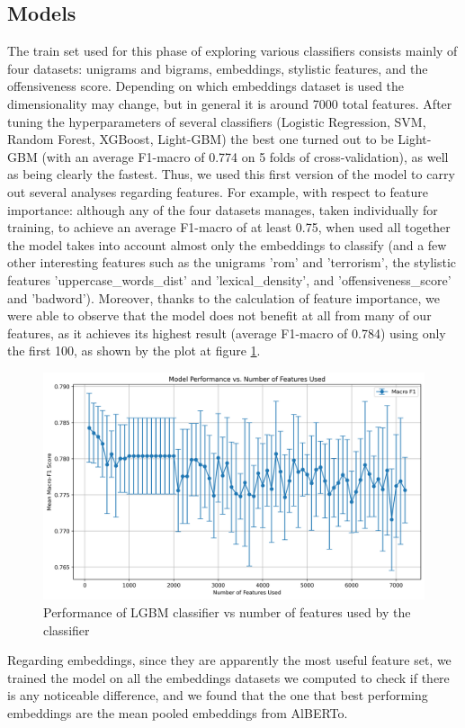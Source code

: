 \subsection{Models}

The train set used for this phase of exploring various classifiers consists mainly of four datasets: unigrams and bigrams, embeddings, stylistic features, and the offensiveness score. Depending on which embeddings dataset is used the dimensionality may change, but in general it is around 7000 total features.
{}
After tuning the hyperparameters of several classifiers (Logistic Regression, SVM, Random Forest, XGBoost, Light-GBM) the best one turned out to be Light-GBM (with an average F1-macro of 0.774 on 5 folds of cross-validation), as well as being clearly the fastest. Thus, we used this first version of the model to carry out several analyses regarding features.
For example, with respect to feature importance: although any of the four datasets manages, taken individually for training, to achieve an average F1-macro of at least 0.75, when used all together the model takes into account almost only the embeddings to classify (and a few other interesting features such as the unigrams 'rom' and 'terrorism', the stylistic features 'uppercase\_words\_dist' and 'lexical\_density', and 'offensiveness\_score' and 'badword').
Moreover, thanks to the calculation of feature importance, we were able to observe that the model does not benefit at all from many of our features, as it achieves its highest result (average F1-macro of 0.784) using only the first 100, as shown by the plot at figure \ref{fig:features}.

\begin{figure}
    \includegraphics[width=\columnwidth]{../../results/images/model_n_feats.png}
    \caption{Performance of LGBM classifier vs number of features used by the classifier}
    \label{fig:features}
\end{figure}
Regarding embeddings, since they are apparently the most useful feature set, we trained the model on all the embeddings datasets we computed to check if there is any noticeable difference, and we found that the one that best performing embeddings are the mean pooled embeddings from AlBERTo.

